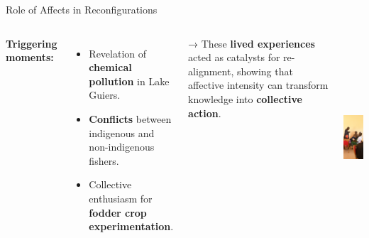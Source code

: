 \documentclass[newPxFont]{beamer}
\begin{document}
\begin{frame}[c]{Role of Affects in Reconfigurations}
  \vspace{-0.5cm}
  \begin{columns}[onlytextwidth,T]
    \column{\dimexpr\linewidth-30mm-5mm}

    \textbf{Triggering moments:}
    \begin{itemize}
      \item Revelation of \textbf{chemical pollution} in Lake Guiers.  
      \item \textbf{Conflicts} between indigenous and non-indigenous fishers.  
      \item Collective enthusiasm for \textbf{fodder crop experimentation}.  
    \end{itemize}

    \vspace{0.3cm}
    → These \textbf{lived experiences} acted as catalysts for re-alignment,  
    showing that affective intensity can transform knowledge into \textbf{collective action}.

    \column{30mm}
    
    \includegraphics[height=7.5cm]{img/group_w}
  \end{columns}
\end{frame}
\end{document}
